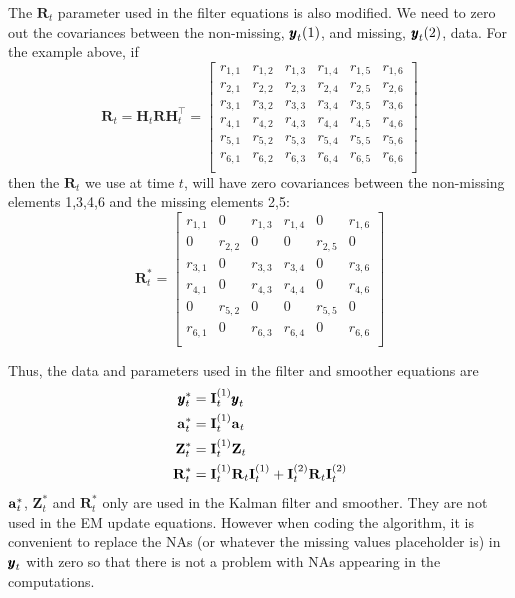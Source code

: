 \documentclass[]{article}
\def\ZZ{\mbox{$\mathbf Z$}}	\def\zz{\mbox{$\mathbf z$}}
\def\II{\mbox{$\mathbf I$}} \def\ii{\mbox{$\mathbf i$}}
\def\IIm{\mbox{$\mathbf I$}}
\def\RR{\mbox{$\mathbf R$}}	 \def\rr{\mbox{$\mathbf r$}}
\def\Rb{\mbox{$\mathbf H$}}	\def\Rm{\mathbb{R}}
\begin{document}
The $\RR_t$ parameter used in the filter equations is also modified.  We need to zero out the covariances between the non-missing, $\yy_t(1)$, and missing, $\yy_t(2)$, data.  For the example above, if
\begin{equation}
\RR_t = \Rb_t\RR\Rb_t^\top = \begin{bmatrix}
r_{1,1}&r_{1,2}&r_{1,3}&r_{1,4}&r_{1,5}&r_{1,6}\\
r_{2,1}&r_{2,2}&r_{2,3}&r_{2,4}&r_{2,5}&r_{2,6}\\
r_{3,1}&r_{3,2}&r_{3,3}&r_{3,4}&r_{3,5}&r_{3,6}\\
r_{4,1}&r_{4,2}&r_{4,3}&r_{4,4}&r_{4,5}&r_{4,6}\\
r_{5,1}&r_{5,2}&r_{5,3}&r_{5,4}&r_{5,5}&r_{5,6}\\
r_{6,1}&r_{6,2}&r_{6,3}&r_{6,4}&r_{6,5}&r_{6,6}\\
\end{bmatrix}
\end{equation}
then the $\RR_t$ we use at time $t$, will have zero covariances between the non-missing elements 1,3,4,6 and the missing elements 2,5:
\begin{equation}
\RR_t^*
 = \begin{bmatrix}
r_{1,1}&0&r_{1,3}&r_{1,4}&0&r_{1,6}\\
0&r_{2,2}&0&0&r_{2,5}&0\\
r_{3,1}&0&r_{3,3}&r_{3,4}&0&r_{3,6}\\
r_{4,1}&0&r_{4,3}&r_{4,4}&0&r_{4,6}\\
0&r_{5,2}&0&0&r_{5,5}&0\\
r_{6,1}&0&r_{6,3}&r_{6,4}&0&r_{6,6}\\
\end{bmatrix}
\end{equation}

Thus, the data and parameters used in the filter and smoother equations are
\begin{equation}
\begin{split}
\yy_t^*&=\IIm_t^{(1)}\yy_t\\
\aa_t^*&=\IIm_t^{(1)}\aa_t\\
\ZZ_t^*&=\IIm_t^{(1)}\ZZ_t\\
\RR_t^* &= \IIm_t^{(1)}\RR_t\IIm_t^{(1)} + \IIm_t^{(2)}\RR_t\II_t^{(2)}
\end{split}
\end{equation}
$\aa_t^*$, $\ZZ_t^*$ and $\RR_t^*$ only are used in the Kalman filter and smoother.  They are not used in the EM update equations.  However when coding the algorithm, it is convenient to replace the NAs (or whatever the missing values placeholder is) in $\yy_t$ with zero so that there is not a problem with NAs appearing in the computations.
\end{document}
